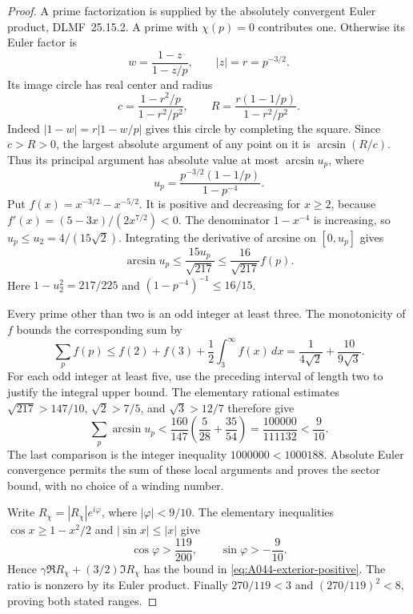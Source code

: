 \begin{proof}
A prime factorization is supplied by the absolutely convergent
Euler product, DLMF~25.15.2.
A prime with $\chi(p)=0$ contributes one. Otherwise its
Euler factor is
\[
               w=\frac{1-z}{1-z/p},
       \qquad |z|=r=p^{-3/2}.
\]
Its image circle has real center and radius
\[
 c=\frac{1-r^2/p}{1-r^2/p^2},\qquad
 R=\frac{r(1-1/p)}{1-r^2/p^2}.
\]
Indeed $|1-w|=r|1-w/p|$ gives this circle by completing
the square. Since $c>R>0$, the largest absolute argument
of any point on it is $\arcsin(R/c)$. Thus its principal
argument has absolute value at most $\arcsin u_p$, where
\[
 u_p=\frac{p^{-3/2}(1-1/p)}{1-p^{-4}}.
\]
Put $f(x)=x^{-3/2}-x^{-5/2}$. It is positive and decreasing
for $x\ge2$, because $f'(x)=(5-3x)/(2x^{7/2})<0$.
The denominator $1-x^{-4}$ is increasing, so
$u_p\le u_2=4/(15\sqrt2)$. Integrating the derivative of
arcsine on $[0,u_p]$ gives
\[
 \arcsin u_p\le\frac{15u_p}{\sqrt{217}}
                    \le\frac{16}{\sqrt{217}}f(p).
\]
Here $1-u_2^2=217/225$ and
$(1-p^{-4})^{-1}\le16/15$.

Every prime other than two is an odd integer at least three.
The monotonicity of $f$ bounds the corresponding sum by
\[
 \sum_p f(p)
 \le f(2)+f(3)+\frac12\int_3^\infty f(x)\,dx
       =\frac1{4\sqrt2}+\frac{10}{9\sqrt3}.
\]
For each odd integer at least five, use the preceding
interval of length two to justify the integral upper bound.
The elementary rational estimates
$\sqrt{217}>147/10$, $\sqrt2>7/5$, and $\sqrt3>12/7$
therefore give
\[
 \sum_p\arcsin u_p
 <\frac{160}{147}\left(\frac5{28}+\frac{35}{54}\right)
   =\frac{100000}{111132}<\frac9{10}.
\]
The last comparison is the integer inequality
$1000000<1000188$. Absolute Euler convergence permits the
sum of these local arguments and proves the sector bound,
with no choice of a winding number.

Write $R_\chi=|R_\chi|e^{i\varphi}$, where
$|\varphi|<9/10$. The elementary inequalities
$\cos x\ge1-x^2/2$ and $|\sin x|\le|x|$ give
\[
 \cos\varphi>\frac{119}{200},\qquad
 \sin\varphi>-\frac9{10}.
\]
Hence
$\gamma\Re R_\chi+(3/2)\Im R_\chi$
has the bound in \eqref{eq:A044-exterior-positive}.
The ratio is nonzero by its Euler product.
Finally $270/119<3$ and $(270/119)^2<8$, proving both
stated ranges.
\end{proof}

